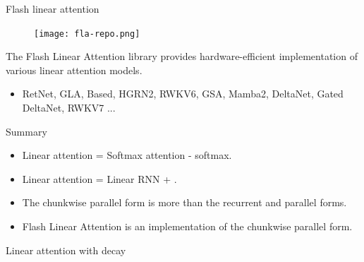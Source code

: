 \begin{frame}{Flash linear attention}
    \begin{figure}
        \centering
        \texttt{[image: fla-repo.png]}
    \end{figure}
    The Flash Linear Attention library provides hardware-efficient implementation of various linear attention models.
    \begin{itemize}
        \item RetNet, GLA, Based, HGRN2, RWKV6, GSA, Mamba2, DeltaNet, Gated DeltaNet, RWKV7  ...
    \end{itemize}
\end{frame}

\begin{frame}{Summary}
    \begin{itemize}
        \item Linear attention = Softmax attention - softmax.
        \item Linear attention = Linear RNN + {\color{red}{matrix-valued hidden state}}.
        \item The chunkwise parallel form is more {\color{red}{hardware-friendly}} than the recurrent and parallel forms.
        \item Flash Linear Attention is an {\color{red}{I/O-aware}} implementation of the chunkwise parallel form.
    \end{itemize}
\end{frame}

\begin{frame}{}
    \centering
    \LARGE
     Linear attention with decay
\end{frame} 



